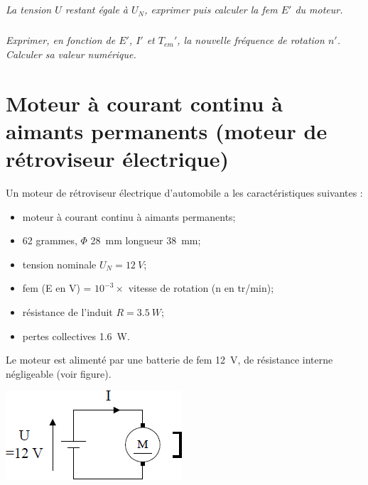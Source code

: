 \documentclass[10pt,fleqn]{article} %
\begin{document}
\begin{multicols}{2}
\begin{multicols}{2}
\subparagraph{}\textit{La tension $U$ restant égale à $U_N$, exprimer puis calculer la fem $E'$ du moteur. }
\ifprof
\begin{corrige}
\end{corrige}
\else
\fi


\subparagraph{}\textit{ Exprimer, en fonction de $E'$, $I'$ et $T_{em}'$, la nouvelle fréquence de rotation $n'$. Calculer sa
valeur numérique. }
\ifprof
\begin{corrige}
\end{corrige}
\else
\fi



\newpage

\section*{Moteur à courant continu à aimants permanents (moteur de
rétroviseur électrique)}

\setcounter{exo}{0}

Un moteur de rétroviseur électrique d’automobile a les caractéristiques suivantes :
\begin{itemize}
\item moteur à courant continu à aimants permanents;
\item 62 grammes, $\Phi$ \SI{28}{mm} longueur \SI{38}{mm};
\item tension nominale $U_N=\SI{12}{V}$;
\item fem (E en V) = $10^{-3} \times$ vitesse de rotation (n en tr/min);
\item résistance de l’induit $R=\SI{3,5}{W}$;
\item pertes collectives \SI{1,6}{W}.
\end{itemize}
Le moteur est alimenté par une batterie de fem \SI{12}{V}, de
résistance interne négligeable (voir figure).

\begin{center}
\includegraphics[width=.9\linewidth]{images/fig_01}
\end{center}


\end{multicols}
\end{multicols}
\end{document}
